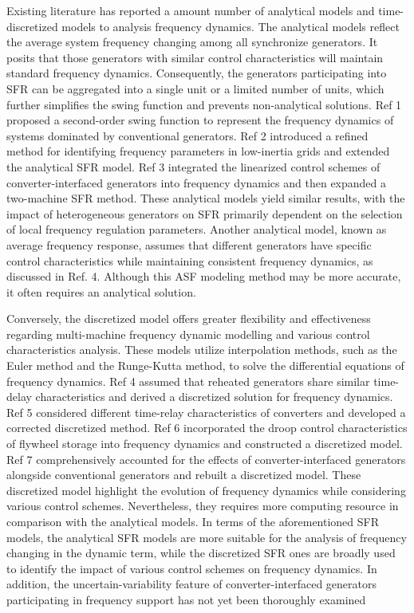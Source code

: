 \documentclass[lettersize,journal]{IEEEtran}
\begin{document}
Existing literature has reported a amount number of analytical models and time-discretized models to analysis frequency dynamics. The analytical models reflect the average system frequency changing
among all synchronize generators. It posits that those generators with similar control characteristics will maintain standard frequency dynamics.  Consequently, the generators participating into SFR
can be aggregated into a single unit or a limited number of units, which further simplifies the swing function and prevents non-analytical solutions. Ref 1 proposed a second-order swing function to
represent the frequency dynamics of systems dominated by conventional generators. Ref 2 introduced a refined method for identifying frequency parameters in low-inertia grids and extended the
analytical SFR model. Ref 3 integrated the linearized control schemes of converter-interfaced generators into frequency dynamics and then expanded a two-machine SFR method. These analytical models
yield similar results, with the impact of heterogeneous generators on SFR primarily dependent on the selection of local frequency regulation parameters. Another analytical model, known as average
frequency response, assumes that different generators have specific control characteristics while maintaining consistent frequency dynamics, as discussed in Ref. 4. Although this ASF modeling method
may be more accurate, it often requires an analytical solution.

Conversely, the discretized model offers greater flexibility and effectiveness regarding multi-machine frequency dynamic modelling and various control characteristics analysis.  These models utilize
interpolation methods, such as the Euler method and the Runge-Kutta method, to solve the differential equations of frequency dynamics.  Ref 4 assumed that reheated generators share similar time-delay
characteristics and derived a discretized solution for  frequency dynamics.  Ref 5 considered different time-relay characteristics of converters and developed a corrected discretized method. Ref 6
incorporated the droop control characteristics of flywheel storage into frequency dynamics and constructed a discretized model. Ref 7 comprehensively accounted for the effects of converter-interfaced
generators alongside conventional generators and rebuilt a discretized model. These discretized model highlight the evolution of frequency dynamics while considering various control schemes.
Nevertheless, they requires more computing resource in comparison with the analytical models. In terms of the aforementioned SFR models, the analytical SFR models are more suitable for the analysis of
frequency changing in the dynamic term, while the discretized SFR ones are broadly used to identify the impact of various control schemes on frequency dynamics. In addition, the uncertain-variability
feature of converter-interfaced generators participating in frequency support has not yet been thoroughly examined
\end{document}
